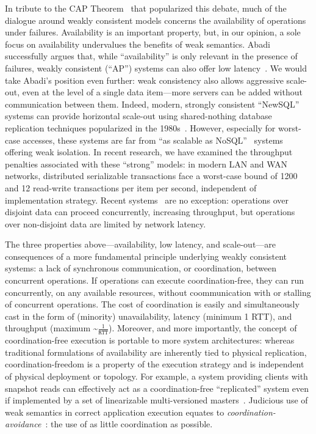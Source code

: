  In tribute to the CAP Theorem~\cite{gilbert-cap} that popularized this debate, much of the dialogue around weakly consistent models concerns the availability of operations under failures. Availability is an important property, but, in our opinion, a sole focus on availability undervalues the benefits of weak semantics. Abadi successfully argues that, while ``availability'' is only relevant in the presence of failures, weakly consistent (``AP'') systems can also offer low latency~\cite{pacelc}. We would take Abadi's position even further: weak consistency also allows aggressive scale-out, even at the level of a single data item---more servers can be added without communication between them. Indeed, modern, strongly consistent ``NewSQL'' systems can provide horizontal scale-out using shared-nothing database replication techniques popularized in the 1980s~\cite{sharednothing}. However, especially for worst-case accesses, these systems are far from ``as scalable as NoSQL''~\cite{f1} systems offering weak isolation. In recent research, we have examined the throughput penalties associated with these ``strong'' models: in modern LAN and WAN networks, distributed serializable transactions face a worst-case bound of 1200 and 12 read-write transactions per item per second, independent of implementation strategy. Recent systems~\cite{spanner,f1} are no exception: operations over disjoint data can proceed concurrently, increasing throughput, but operations over non-disjoint data are limited by network latency.

The three properties above---availability, low latency, and scale-out---are consequences of a more fundamental principle underlying weakly consistent systems: a lack of synchronous communication, or coordination, between concurrent operations. If operations can execute coordination-free, they can run concurrently, on any available resources, without coommunication with or stalling of concurrent operations. The cost of coordination is easily and simultaneously cast in the form of (minority) unavailability, latency (minimum 1 RTT), and throughput (maximum \textasciitilde$\frac{1}{\texttt{RTT}}$). Moreover, and more importantly, the concept of coordination-free execution is portable to more system architectures: whereas traditional formulations of availability are inherently tied to physical replication, coordination-freedom is a property of the execution strategy and is independent of physical deployment or topology. For example, a system providing clients with snapshot reads can effectively act as a coordination-free ``replicated'' system even if implemented by a set of linearizable multi-versioned masters~\cite{ramp-txns}. Judicious use of weak semantics in correct application execution equates to \textit{coordination-avoidance}~\cite{coord-avoid}: the use of as little coordination as possible.

